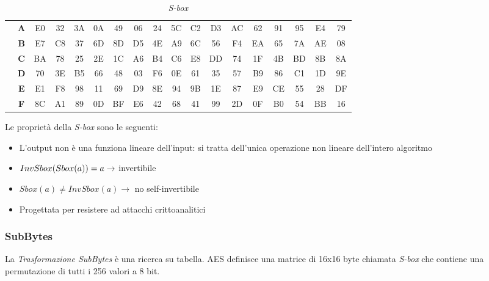 \documentclass[a4paper,11pt]{article}
\begin{document}
\begin{table}[H]
{\begin{tabular}{@{}|c|c|*{16}{c|}}
        \\ \cline{2-18}
        & \cellcolor{gray!25}\textbf{A} & E0 & 32 & 3A & 0A & 49 & 06 & 24 & 5C & C2 & D3 & AC & 62 & 91 & 95 & E4 & 79
        \\ \cline{2-18}
        & \cellcolor{gray!25}\textbf{B} & E7 & C8 & 37 & 6D & 8D & D5 & 4E & A9 & 6C & 56 & F4 & EA & 65 & 7A & AE & 08
        \\ \cline{2-18}
        & \cellcolor{gray!25}\textbf{C} & BA & 78 & 25 & 2E & 1C & A6 & B4 & C6 & E8 & DD & 74 & 1F & 4B & BD & 8B & 8A
        \\ \cline{2-18}
        & \cellcolor{gray!25}\textbf{D} & 70 & 3E & B5 & 66 & 48 & 03 & F6 & 0E & 61 & 35 & 57 & B9 & 86 & C1 & 1D & 9E
        \\ \cline{2-18}
        & \cellcolor{gray!25}\textbf{E} & E1 & F8 & 98 & 11 & 69 & D9 & 8E & 94 & 9B & 1E & 87 & E9 & CE & 55 & 28 & DF
        \\ \cline{2-18}
        & \cellcolor{gray!25}\textbf{F} & 8C & A1 & 89 & 0D & BF & E6 & 42 & 68 & 41 & 99 & 2D & 0F & B0 & 54 & BB & 16\\ \cline{2-18}
        \hline
    \end{tabular}}
    \caption{\textit{S-box}}
\end{table}

Le proprietà della \textit{S-box} sono le seguenti:
\begin{itemize}
    \item L'output non è una funziona lineare dell'input: si tratta dell'unica operazione non lineare dell'intero algoritmo
    \item $InvSbox(S\-box(a)) = a \rightarrow$ invertibile
    \item $Sbox(a) \neq InvSbox(a) \rightarrow$ no self-invertibile
    \item Progettata per resistere ad attacchi crittoanalitici
\end{itemize}

\subsubsection{SubBytes}
La \textit{Trasformazione SubBytes} è una ricerca su tabella.
AES definisce una matrice di 16x16 byte chiamata \textit{S-box} che contiene una permutazione di tutti i 256 valori a 8 bit.
\end{document}
